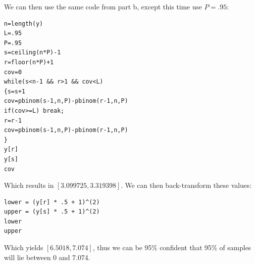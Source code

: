 \documentclass{article}
\begin{document}
\begin{enumerate}
\begin{verbatim}
\end{verbatim}
We can then use the same code from part b, except this time use $P = .95$: \\
\begin{verbatim}
n=length(y)
L=.95
P=.95
s=ceiling(n*P)-1
r=floor(n*P)+1
cov=0
while(s<n-1 && r>1 && cov<L)
{s=s+1
cov=pbinom(s-1,n,P)-pbinom(r-1,n,P)
if(cov>=L) break;
r=r-1
cov=pbinom(s-1,n,P)-pbinom(r-1,n,P)
}
y[r]
y[s]
cov
\end{verbatim}
Which results in $[3.099725, 3.319398]$. We can then back-transform these values: \\
\begin{verbatim}
lower = (y[r] * .5 + 1)^(2)
upper = (y[s] * .5 + 1)^(2)
lower
upper
\end{verbatim}
Which yields $[6.5018, 7.074]$, thus we can be 95\% confident that 95\% of samples will lie between 0 and 7.074. 
\end{enumerate}
\end{document}
